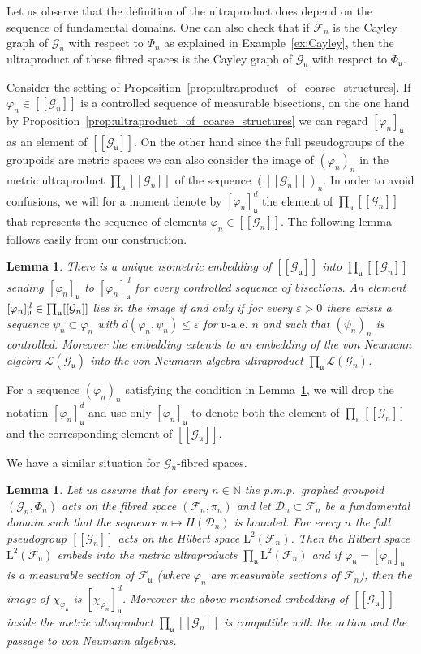 \documentclass[10pt]{amsart}
\newtheorem{lemm}[cdrthm]{Lemma}
\theoremstyle{definition}
\newcommand{\Nmath}{\mathbb{N}}
\newcommand{\LL}{\mathcal{L}}
\newcommand{\cg}{\mathcal{G}}
\newcommand{\cf}{\mathcal{F}}
\newcommand{\cd}{\mathcal{D}}
\newcommand{\LLh}{\mathrm{L}}
\newcommand{\uu}{\mathfrak{u}}
\newcommand{\ul}{\mathfrak{u}}
\newcommand{\ulae}{\mathfrak{u}\textrm{-a.e. }n}
\newcommand{\eps}{\varepsilon}
\newcommand{\ph}{\varphi}
\newcommand{\pmp}{p.m.p.\ }
\begin{document}
Let us observe that the definition of the ultraproduct does depend on the sequence of fundamental domains. One can also check that if $\cf_n$ is the Cayley graph of $\cg_n$ with respect to $\Phi_n$ as explained in Example~\ref{ex:Cayley}, then the ultraproduct of these fibred spaces is the Cayley graph of $\cg_\ul$ with respect to $\Phi_\ul$.

Consider the setting of Proposition~\ref{prop:ultraproduct_of_coarse_structures}. If $\ph_n \in [[\cg_n]]$ is a controlled sequence of measurable bisections, on the one hand by Proposition~\ref{prop:ultraproduct_of_coarse_structures} we can regard $[\ph_n]_\ul$ as an element of $[[\cg_\ul]]$. On the other hand since the full pseudogroups of the groupoids are metric spaces we can also consider the image of $(\ph_n)_n$ in the metric ultraproduct $\prod_\uu [[\cg_n]]$ of the sequence $([[\cg_n]])_n$. In order to avoid confusions, we will for a moment denote by $[\ph_n]_\ul^d$ the element of $\prod_\uu [[\cg_n]]$ that represents the sequence of elements $\ph_n\in [[\cg_n]]$. The following lemma follows easily from our construction.

\begin{lemm}\label{lem:ultraproduct_of_pseudo_full_groups}
There is a unique isometric embedding of $[[\cg_\ul]]$ into $\prod_\uu [[\cg_n]]$ sending $[\ph_n]_\ul$ to $[\ph_n]_\ul^d$ for every controlled sequence of bisections. An element $[\ph_n]_\ul^d\linebreak\in \prod_\uu [[\cg_n]]$ lies in the image if and only if for every $\eps>0$ there exists a sequence $\psi_n \subset
\ph_n$ with $d(\ph_n,\psi_n) \leq \eps$ for $\ulae$ and such that $(\psi_n)_n$ is controlled. Moreover the embedding extends to an embedding of the von Neumann algebra $\LL(\cg_\uu)$ into the von Neumann algebra ultraproduct $\prod_\uu \LL(\cg_n)$.
\end{lemm}

For a sequence $(\varphi_n)_n$ satisfying the condition in Lemma~\ref{lem:ultraproduct_of_pseudo_full_groups}, we will drop the notation $[\ph_n]_\ul^d$ and use only $[\ph_n]_\ul$ to denote both the element of $\prod_\uu [[\cg_n]]$ and the corresponding element of $[[\cg_\ul]]$.

We have a similar situation for $\cg_n$-fibred spaces.

\begin{lemm}\label{lem:ultraproductactions}
Let us assume that for every $n\in\Nmath$ the \pmp graphed groupoid $(\cg_n,\Phi_n)$ acts on the fibred space $(\cf_n,\pi_n)$ and let $\cd_n\subset\cf_n$ be a fundamental domain such that the sequence $n\mapsto H(\cd_n)$ is bounded. For every $n$ the full pseudogroup $[[\cg_n]]$ acts on the Hilbert space $\LLh^2(\cf_n)$. Then the Hilbert space $\LLh^2(\cf_\ul)$ embeds into the metric ultraproducts $\prod_\ul \LLh^2(\cf_n)$ and if $\ph_\ul=[\ph_n]_\ul$ is a measurable section of $\cf_\ul$ (where $\ph_n$ are measurable sections of $\cf_n$), then the image of $\chi_{\ph_\ul}$ is $[\chi_{\ph_n}]_\ul^d$. Moreover the above mentioned embedding of $[[\cg_\ul]]$ inside the metric ultraproduct $\prod_\uu [[\cg_n]]$ is compatible with the action and the passage to von Neumann algebras.
\end{lemm}
\end{document}

